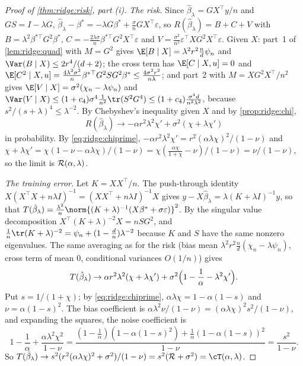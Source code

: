 \begin{refsection}
\begin{proof}[Proof of \cref{thm:ridge:risk}, part (i)]
\emph{The risk.} Since $\hat\beta_\lambda=GX^\top y/n$ and $GS=I-\lambda G$, $\hat\beta_\lambda-\beta^*=-\lambda G\beta^*+\frac\sigma nGX^\top\varepsilon$, so $R(\hat\beta_\lambda)=B+C+V$ with $B=\lambda^2\beta^{*\top}G^2\beta^*$, $C=-\frac{2\lambda\sigma}n\beta^{*\top}G^2X^\top\varepsilon$ and $V=\frac{\sigma^2}{n^2}\varepsilon^\top XG^2X^\top\varepsilon$. Given $X$: part~1 of \cref{lem:ridge:quad} with $M=G^2$ gives $\E[B\mid X]=\lambda^2r^2\frac nd\psi_n$ and $\Var(B\mid X)\le2r^4/(d+2)$; the cross term has $\E[C\mid X,u]=0$ and $\E[C^2\mid X,u]=\frac{4\lambda^2\sigma^2}n\beta^{*\top}G^2SG^2\beta^*\le\frac{4\sigma^2r^2}{n\lambda}$; and part~2 with $M=XG^2X^\top/n^2$ gives $\E[V\mid X]=\sigma^2(\chi_n-\lambda\psi_n)$ and $\Var(V\mid X)\le(1+c_4)\sigma^4\frac1{n^2}\tr(S^2G^4)\le(1+c_4)\frac{\sigma^4d}{n^2\lambda^2}$, because $s^2/(s+\lambda)^4\le\lambda^{-2}$. By Chebyshev's inequality given $X$ and by \cref{prop:ridge:chi},
\begin{equation}\label{eq:ridge:riskderiv}
R(\hat\beta_\lambda)\to-\alpha r^2\lambda^2\chi'+\sigma^2(\chi+\lambda\chi')
\end{equation}
in probability. By \eqref{eq:ridge:chiprime}, $-\alpha r^2\lambda^2\chi'=r^2(\alpha\lambda\chi)^2/(1-\nu)$ and $\chi+\lambda\chi'=\chi(1-\nu-\alpha\lambda\chi)/(1-\nu)=\chi(\frac{\alpha\chi}{1+\chi}-\nu)/(1-\nu)=\nu/(1-\nu)$, so the limit is $\mathcal{R}(\alpha,\lambda)$.

\emph{The training error.} Let $K=XX^\top/n$. The push-through identity $X(X^\top X+n\lambda I)^{-1}=(XX^\top+n\lambda I)^{-1}X$ gives $y-X\hat\beta_\lambda=\lambda(K+\lambda I)^{-1}y$, so that $T(\hat\beta_\lambda)=\frac{\lambda^2}n\norm{(K+\lambda)^{-1}(X\beta^*+\sigma\varepsilon)}^2$. By the singular value decomposition $X^\top(K+\lambda)^{-2}X=nSG^2$, and $\frac1n\tr(K+\lambda)^{-2}=\psi_n+(1-\frac dn)\lambda^{-2}$ because $K$ and $S$ have the same nonzero eigenvalues. The same averaging as for the risk (bias mean $\lambda^2r^2\frac nd(\chi_n-\lambda\psi_n)$, cross term of mean $0$, conditional variances $O(1/n)$) gives
\[
T(\hat\beta_\lambda)\to\alpha r^2\lambda^2(\chi+\lambda\chi')+\sigma^2\Bigl(1-\frac1\alpha-\lambda^2\chi'\Bigr).
\]
Put $s=1/(1+\chi)$; by \eqref{eq:ridge:chiprime}, $\alpha\lambda\chi=1-\alpha(1-s)$ and $\nu=\alpha(1-s)^2$. The bias coefficient is $\alpha\lambda^2\nu/(1-\nu)=(\alpha\lambda\chi)^2s^2/(1-\nu)$, and expanding the squares, the noise coefficient is
\[
1-\frac1\alpha+\frac{\alpha\lambda^2\chi^2}{1-\nu}=\frac{(1-\frac1\alpha)(1-\alpha(1-s)^2)+\frac1\alpha(1-\alpha(1-s))^2}{1-\nu}=\frac{s^2}{1-\nu}.
\]
So $T(\hat\beta_\lambda)\to s^2(r^2(\alpha\lambda\chi)^2+\sigma^2)/(1-\nu)=s^2(\ridgeR+\sigma^2)=\cT(\alpha,\lambda)$.
\end{proof}


\end{refsection}
